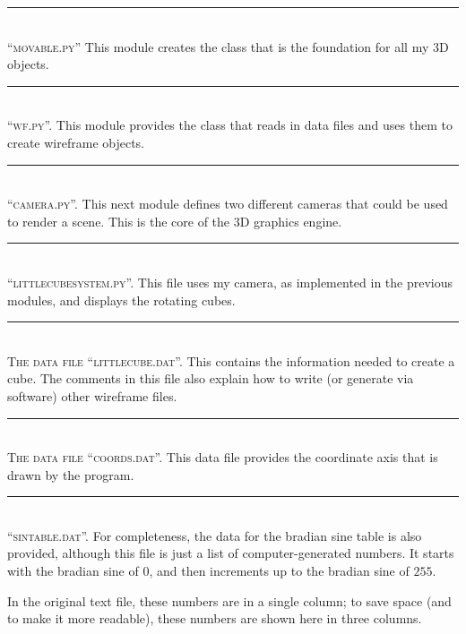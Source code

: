 \documentclass[12pt]{article}
\newcommand{\normaltitleize}[1]{\mbox{}\\ \textsc{#1} \normalsize}
\newcommand{\sectionline}{
\begin{center}
   \rule{1in}{.01in}
\end{center}
}
\begin{document}



\sectionline

\normaltitleize{``movable.py''}  This module creates the class that is the foundation for all my 3D objects.




\sectionline

\normaltitleize{``wf.py''.}  This module provides the class that reads in data files and uses them to create wireframe objects.




\sectionline

\normaltitleize{``camera.py''.} This next module defines two different cameras that could be used to render a scene.  This is the core of the 3D graphics engine.




\sectionline

\normaltitleize{``littlecubesystem.py''.}  This file uses my camera, as implemented in the previous modules, and displays the rotating cubes.




\sectionline

\normaltitleize{The data file ``littlecube.dat''.}  This contains the information needed to create a cube.  The comments in this file also explain how to write (or generate via software) other wireframe files.




\sectionline

\normaltitleize{The data file ``coords.dat''.}  This data file provides the coordinate axis that is drawn by the program.




\sectionline

\normaltitleize{``sintable.dat''.}  For completeness, the data for the bradian sine table is also provided, although this file is just a list of computer-generated numbers.  It starts with the bradian sine of $0$, and then increments up to the bradian sine of $255$.

In the original text file, these numbers are in a single column; to save space (and to make it more readable), these numbers are shown here in three columns.

\begin{multicols}{3}

\end{multicols}
\end{document}
